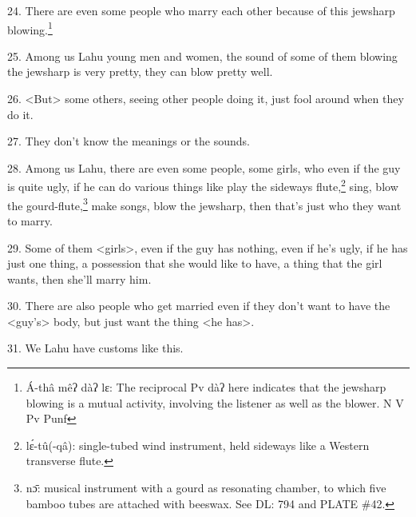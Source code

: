 24. There are even some people who marry each other because of this jewsharp blowing.\footnote{Á-thâ mêʔ dàʔ lɛ: The reciprocal Pv dàʔ here indicates that the jewsharp blowing is a mutual activity, involving the listener as well as the blower.   N  V  Pv  Punf}

25. Among us Lahu young men and women, the sound of some of them blowing the jewsharp
is very pretty, they can blow pretty well.

26. <But> some others, seeing other people doing it, just fool
around when they do it.

27. They don't know the meanings or the sounds.

28. Among us Lahu, there are even some people, some girls, who even if the guy
is quite ugly, if he can do various things like play the sideways flute,\footnote{lɛ́-tû(-qâ): single-tubed wind instrument, held sideways like a Western transverse flute.} sing,
blow the gourd-flute,\footnote{nɔ̄: musical instrument with a gourd as resonating chamber, to which five bamboo tubes are attached with beeswax. See DL: 794 and PLATE \#42.} make songs, blow the jewsharp, then that's just who they
want to marry.

29. Some of them <girls>, even if the guy has nothing, even if
he's ugly, if he has just one thing, a possession that she would like to have,
a thing that the girl wants, then she'll marry him.

30. There are also people who get married even if they don't want to have the <guy's>
body, but just want the thing <he has>.

31. We Lahu have customs like this.

